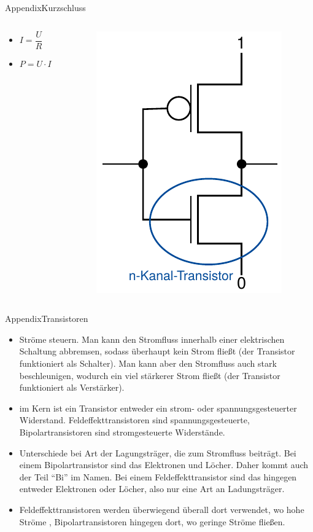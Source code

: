 \begin{frame}[allowframebreaks]{Appendix}{Kurzschluss}
  \begin{columns}
    \begin{column}{0.5\textwidth}
      \begin{itemize}
        \item $I=\dfrac{U}{R}$
        \item $P = U\cdot I$
      \end{itemize}
    \end{column}
    \begin{column}{0.5\textwidth}
      \includegraphics[height=0.6\textheight]{./figures/inverter.png}
    \end{column}
  \end{columns}
\end{frame}

\begin{frame}{Appendix}{Transistoren}
  \begin{itemize}
    \item Ströme steuern. Man kann den Stromfluss innerhalb einer elektrischen Schaltung abbremsen, sodass überhaupt kein Strom fließt (der Transistor funktioniert als Schalter). Man kann aber den Stromfluss auch stark beschleunigen, wodurch ein viel stärkerer Strom fließt (der Transistor funktioniert als Verstärker).
    \item im Kern ist ein Transistor entweder ein strom- oder spannungsgesteuerter Widerstand. Feldeffekttransistoren sind spannungsgesteuerte, Bipolartransistoren sind stromgesteuerte Widerstände.
    \item Unterschiede bei Art der \alert{Lagungsträger}, die zum Stromfluss beiträgt. Bei einem \alert{Bipolartransistor} sind das Elektronen und Löcher. Daher kommt auch der Teil \enquote{Bi} im Namen. Bei einem \alert{Feldeffekttransistor} sind das hingegen entweder Elektronen oder Löcher, also nur eine Art an Ladungsträger.
    \item Feldeffekttransistoren werden überwiegend überall dort verwendet, wo hohe Ströme , Bipolartransistoren hingegen dort, wo geringe Ströme fließen.
  \end{itemize}
\end{frame}

